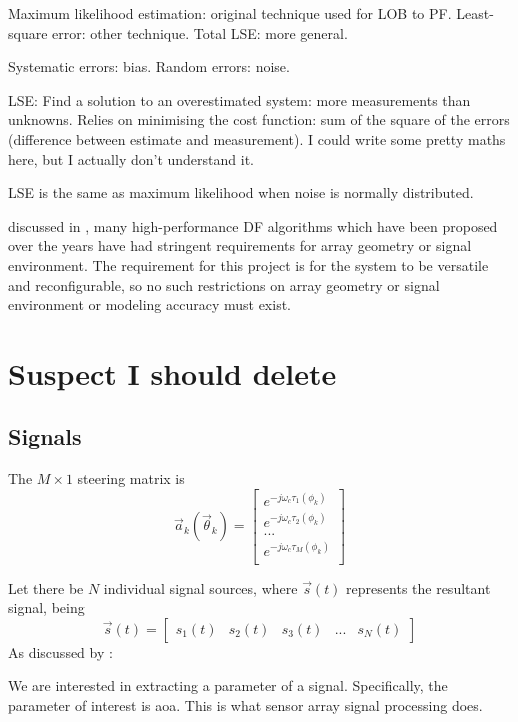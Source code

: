 Maximum likelihood estimation: original technique used for LOB to PF. 
Least-square error: other technique. Total LSE: more general. 

Systematic errors: bias. Random errors: noise. 

LSE: Find a solution to an overestimated system: more measurements than unknowns. Relies on minimising the cost function: sum of the square of the errors (difference between estimate and measurement). I could write some pretty maths here, but I actually don't understand it. 

LSE is the same as maximum likelihood when noise is normally distributed.

discussed in \cite{farrier1990direction}, many high-performance DF algorithms which have been proposed over the years have had stringent requirements for array geometry or signal environment. The requirement for this project is for the system to be versatile and reconfigurable, so no such restrictions on array geometry or signal environment or modeling accuracy must exist. 

\section{Suspect I should delete}
\subsection{Signals}
The \(M \times 1\) steering matrix is
\begin{equation}
  \vec{a}_k(\vec{\theta}_k) = 
  \begin{bmatrix}
    e^{-j\omega_c \tau_1(\phi_k)} \\
    e^{-j\omega_c \tau_2(\phi_k)} \\
    ... \\
    e^{-j\omega_c \tau_M(\phi_k)} \\
  \end{bmatrix}
\end{equation}

Let there be $N$ individual signal sources, where $\vec{s}(t)$ represents the resultant signal, being
\begin{equation}
\vec{s}(t) = \begin{bmatrix} s_{1}(t) & s_{2}(t) & s_3(t) & ... & s_N(t) \end{bmatrix}
\end{equation}
As discussed by \cite{krim1996two}:

We are interested in extracting a parameter of a signal. Specifically, the parameter of interest is \gls{aoa}. This is what sensor array signal processing does.

